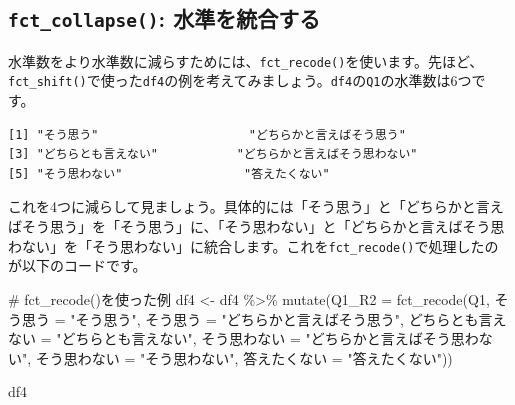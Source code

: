 \documentclass[
  a4paper,
  pandoc,
  ja=standard,
  jafont=haranoaji]{bxjsbook}
\newenvironment{Shaded}{\begin{snugshade}}{\end{snugshade}}
\newcommand{\AttributeTok}[1]{\textcolor[rgb]{0.00,0.48,0.65}{#1}}
\newcommand{\CommentTok}[1]{\textcolor[rgb]{0.37,0.37,0.37}{#1}}
\newcommand{\FunctionTok}[1]{\textcolor[rgb]{0.28,0.35,0.67}{#1}}
\newcommand{\NormalTok}[1]{\textcolor[rgb]{0.00,0.48,0.65}{#1}}
\newcommand{\OtherTok}[1]{\textcolor[rgb]{0.00,0.48,0.65}{#1}}
\newcommand{\SpecialCharTok}[1]{\textcolor[rgb]{0.37,0.37,0.37}{#1}}
\newcommand{\StringTok}[1]{\textcolor[rgb]{0.13,0.47,0.30}{#1}}
\begin{document}
\hypertarget{fct_collapse-ux6c34ux6e96ux3092ux7d71ux5408ux3059ux308b}{%
\subsection{\texorpdfstring{\texttt{fct\_collapse()}:
水準を統合する}{fct\_collapse(): 水準を統合する}}\label{fct_collapse-ux6c34ux6e96ux3092ux7d71ux5408ux3059ux308b}}

水準数をより水準数に減らすためには、\texttt{fct\_recode()}を使います。先ほど、\texttt{fct\_shift()}で使った\texttt{df4}の例を考えてみましょう。\texttt{df4}の\texttt{Q1}の水準数は6つです。

\begin{Shaded}
\end{Shaded}

\begin{verbatim}
[1] "そう思う"                     "どちらかと言えばそう思う"    
[3] "どちらとも言えない"           "どちらかと言えばそう思わない"
[5] "そう思わない"                 "答えたくない"                
\end{verbatim}

これを4つに減らして見ましょう。具体的には「そう思う」と「どちらかと言えばそう思う」を「そう思う」に、「そう思わない」と「どちらかと言えばそう思わない」を「そう思わない」に統合します。これを\texttt{fct\_recode()}で処理したのが以下のコードです。

\begin{Shaded}
\begin{Highlighting}[numbers=left,,]
\CommentTok{\# fct\_recode()を使った例}
\NormalTok{df4 }\OtherTok{\textless{}{-}}\NormalTok{ df4 }\SpecialCharTok{\%\textgreater{}\%} 
    \FunctionTok{mutate}\NormalTok{(}\AttributeTok{Q1\_R2 =} \FunctionTok{fct\_recode}\NormalTok{(Q1,}
\NormalTok{                              そう思う          }\OtherTok{=} \StringTok{"そう思う"}\NormalTok{,}
\NormalTok{                              そう思う          }\OtherTok{=} \StringTok{"どちらかと言えばそう思う"}\NormalTok{,}
\NormalTok{                              どちらとも言えない  }\OtherTok{=} \StringTok{"どちらとも言えない"}\NormalTok{,}
\NormalTok{                              そう思わない       }\OtherTok{=} \StringTok{"どちらかと言えばそう思わない"}\NormalTok{,}
\NormalTok{                              そう思わない       }\OtherTok{=} \StringTok{"そう思わない"}\NormalTok{,}
\NormalTok{                              答えたくない       }\OtherTok{=} \StringTok{"答えたくない"}\NormalTok{))}

\NormalTok{df4}
\end{Highlighting}
\end{Shaded}
\end{document}
